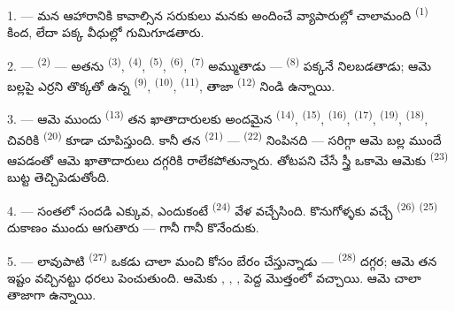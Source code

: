 \VUsaut{4.0mm}
\VUsaut{3.0mm}

\VUsaut{3.0mm}

1. --- మన ఆహారానికి కావాల్సిన సరుకులు మనకు అందించే వ్యాపారుల్లో చాలామంది
  \textsuperscript{(1)} కింద, లేదా పక్క వీధుల్లో
గుమిగూడతారు.

2. ---  \textsuperscript{(2)} — అతను 
\textsuperscript{(3)},  \textsuperscript{(4)}, 
\textsuperscript{(5)},  \textsuperscript{(6)},
 \textsuperscript{(7)} అమ్ముతాడు — 
\textsuperscript{(8)} పక్కనే నిలబడతాడు; ఆమె బల్లపై ఎర్రని తొక్కతో ఉన్న
 \textsuperscript{(9)}, 
\textsuperscript{(10)},  \textsuperscript{(11)}, తాజా
 \textsuperscript{(12)} నిండి ఉన్నాయి.

3. --- ఆమె ముందు  \textsuperscript{(13)} తన ఖాతాదారులకు అందమైన
 \textsuperscript{(14)},  \textsuperscript{(15)},
 \textsuperscript{(16)},  \textsuperscript{(17)},
 \textsuperscript{(19)},  \textsuperscript{(18)},
చివరికి  \textsuperscript{(20)} కూడా చూపిస్తుంది. కానీ
 తన  \textsuperscript{(21)} —
 \textsuperscript{(22)} నింపినది — సరిగ్గా ఆమె బల్ల ముందే ఆపడంతో ఆమె
ఖాతాదారులు దగ్గరికి రాలేకపోతున్నారు. తోటపని చేసే స్త్రీ ఒకామె ఆమెకు
 \textsuperscript{(23)} బుట్ట తెచ్చిపెడుతోంది.

\VUsaut{4.0mm}
\VUsaut{3.0mm}

4. --- సంతలో సందడి ఎక్కువ, ఎందుకంటే  \textsuperscript{(24)} వేళ
వచ్చేసింది. కొనుగోళ్ళకు వచ్చే  \textsuperscript{(26)}
 \textsuperscript{(25)} దుకాణం ముందు ఆగుతారు —
 గానీ  గానీ కొనేందుకు.

5. --- లావుపాటి  \textsuperscript{(27)} ఒకడు చాలా మంచి 
కోసం బేరం చేస్తున్నాడు —  \textsuperscript{(28)} దగ్గర; ఆమె తన ఇష్టం
వచ్చినట్టు ధరలు పెంచుతుంది. ఆమెకు , ,
,  పెద్ద మొత్తంలో వచ్చాయి. ఆమె
  చాలా తాజాగా ఉన్నాయి.

